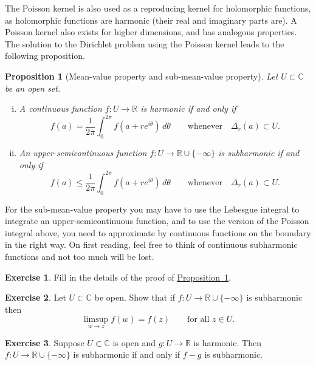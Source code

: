 \documentclass[12pt,openany]{book}
\newcommand{\C}{{\mathbb{C}}}
\newcommand{\R}{{\mathbb{R}}}
\theoremstyle{plain}
\newtheorem{prop}[thm]{Proposition}
\theoremstyle{remark}
\theoremstyle{definition}
\newenvironment{exbox}{%
    \def\FrameCommand{\vrule width 1pt \relax\hspace {10pt}}%
    \MakeFramed {\advance \hsize -\width \FrameRestore }%
}{%
    \endMakeFramed
}
\theoremstyle{exercise}
\newtheorem{exercise}{Exercise}[section]
\theoremstyle{example}
\newcommand{\propref}[1]{\hyperref[#1]{Proposition~\ref*{#1}}}
\begin{document}
The Poisson kernel is also used as a reproducing kernel for
holomorphic functions, as holomorphic functions are harmonic (their real and
imaginary parts are).
A Poisson kernel also exists for higher dimensions, and has
analogous properties.
The solution to the Dirichlet problem using the Poisson kernel leads to
the following proposition.

\pagebreak[2]
\begin{prop}[Mean-value property and sub-mean-value property]
\label{prop:meansubmeanprop}
Let $U \subset \C$ be an open set.
\begin{enumerate}[(i)]
\item
A continuous function
$f \colon U \to \R$
is harmonic if and only if 
\begin{equation*}
f(a) = \frac{1}{2\pi} \int_0^{2\pi} f(a+re^{i\theta})\, d\theta
\qquad \text{whenever} \quad
\overline{\Delta_r(a)} \subset U .
\end{equation*}
\item
An upper-semicontinuous function $f \colon U \to \R \cup \{ -\infty \}$
is subharmonic if and only if
\begin{equation*}
f(a) \leq \frac{1}{2\pi} \int_0^{2\pi} f(a+re^{i\theta})\, d\theta
\qquad \text{whenever} \quad
\overline{\Delta_r(a)} \subset U .
\end{equation*}
\end{enumerate}
\end{prop}

For the sub-mean-value property you may have to use 
the Lebesgue integral to integrate an upper-semicontinuous function,
and to use the version of the Poisson integral above, you need to
approximate by continuous functions on the boundary in the right way.
On first reading, feel free to think of continuous subharmonic
functions and not too much will be lost.

\begin{exbox}
\begin{exercise}
Fill in the details of the proof of \propref{prop:meansubmeanprop}.
\end{exercise}

\begin{exercise}
Let $U \subset \C$ be open.
Show that if $f \colon U \to \R \cup\{- \infty \}$ is subharmonic
then 
\begin{equation*}
\limsup_{w \to z} f(w) = f(z) 
\qquad \text{for all $z \in U$.}
\end{equation*}
\end{exercise}

\begin{exercise} \label{exercise:fminusgsubharmonic}
Suppose $U \subset \C$ is open and $g \colon U \to \R$ is harmonic.
Then $f \colon U \to \R \cup \{ -\infty \}$ is subharmonic if and only if $f-g$
is subharmonic.
\end{exercise}
\end{exbox}
\end{document}
